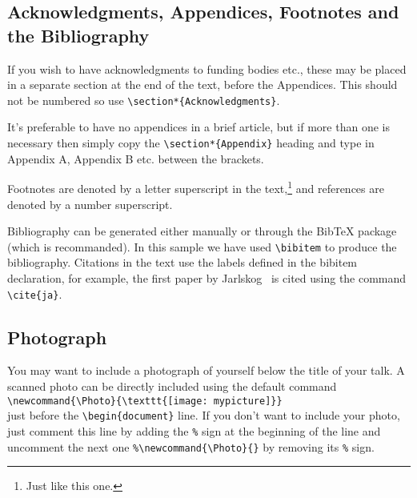 \documentclass{moriond}
\newcommand{\Photo}{\texttt{[image: mypicture]}}
\begin{document}
\subsection{Acknowledgments, Appendices, Footnotes and the Bibliography}

If you wish to have
acknowledgments to funding bodies etc., these may be placed in a separate
section at the end of the text, before the Appendices. This should not
be numbered so use \verb^\section*{Acknowledgments}^.

It's preferable to have no appendices in a brief article, but if more
than one is necessary then simply copy the
\verb^\section*{Appendix}^
heading and type in Appendix A, Appendix B etc. between the brackets.

Footnotes are denoted by a letter superscript
in the text,\footnote{Just like this one.} and references
are denoted by a number superscript.

Bibliography can be generated either manually or through the BibTeX
package (which is recommanded). In this sample we
have used \verb^\bibitem^ to produce the bibliography.
Citations in the text use the labels defined in the bibitem declaration,
for example, the first paper by Jarlskog~\cite{ja} is cited using the command
\verb^\cite{ja}^.


\subsection{Photograph}

You may want to include a photograph of yourself below the title
of your talk. A scanned photo can be 
directly included using the default command\\
\verb^\newcommand{\Photo}{\texttt{[image: mypicture]}}^\\
just before the 
\verb^\begin{document}^
line. If you don't want to include your photo, just comment this line
by adding the \verb^%^ sign at the beginning of 
the line and uncomment the next one
\verb^%\newcommand{\Photo}{}^ by removing its \verb^%^ sign.
\end{document}
